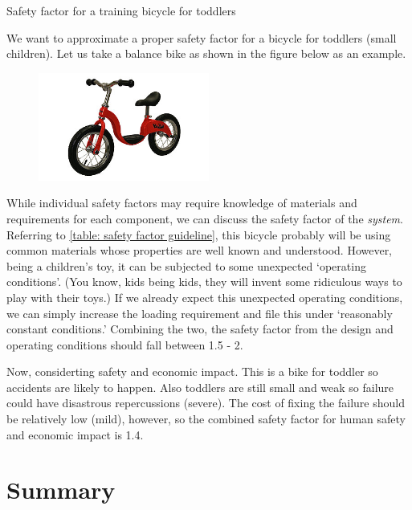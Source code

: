 \documentclass[
10pt,
a4paper,
openany,
svgnames,
]{book}
\begin{document}
\begin{example}{Safety factor for a training bicycle for toddlers}

  We want to approximate a proper safety factor for a bicycle for toddlers (small children). Let us take a balance bike as shown in the figure below as an example.

  \begin{figure}[H]
    \centering
    \includegraphics[width=0.5\textwidth]{pictures/intro-eng-design/balance-bike}
  \end{figure}
\end{example}
\begin{solution}

  While individual safety factors may require knowledge of materials and requirements for each component, we can discuss the safety factor of the \emph{system}. Referring to \cref{table: safety factor guideline}, this bicycle probably will be using common materials whose properties are well known and understood. However, being a children's toy, it can be subjected to some unexpected `operating conditions'. (You know, kids being kids, they will invent some ridiculous ways to play with their toys.) If we already expect this unexpected operating conditions, we can simply increase the loading requirement and file this under `reasonably constant conditions.' Combining the two, the safety factor from the design and operating conditions should fall between 1.5 - 2.

  Now, considerting safety and economic impact. This is a bike for toddler so accidents are likely to happen. Also toddlers are still small and weak so failure could have disastrous repercussions (severe). The cost of fixing the failure should be relatively low (mild), however, so the combined safety factor for human safety and economic impact is 1.4.
\end{solution}

\section*{Summary}
\end{document}

